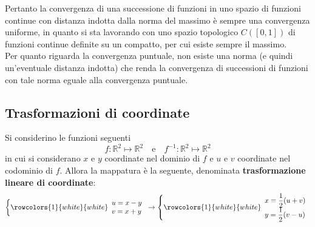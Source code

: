 \documentclass[a4paper]{extarticle}
\begin{document}
Pertanto la convergenza di una successione di funzioni in uno spazio di funzioni continue con distanza indotta dalla norma del massimo è sempre una convergenza uniforme, in quanto si sta lavorando con uno spazio topologico $C([0,1])$ di funzioni continue definite su un compatto, per cui esiste sempre il massimo.\\
Per quanto riguarda la convergenza puntuale, non esiste una norma (e quindi un'eventuale distanza indotta) che renda la convergenza di successioni di funzioni con tale norma eguale alla convergenza puntuale.

\vspace{1em}
\noindent
\subsection{Trasformazioni di coordinate}
Si considerino le funzioni seguenti
\[f : \mathbb{R}^2 \longmapsto \mathbb{R}^2 \hspace{1em} \text{e} \hspace{1em} f^{-1} : \mathbb{R}^2 \longmapsto \mathbb{R}^2\]
in cui si considerano $x$ e $y$ coordinate nel dominio di $f$ e $u$ e $v$ coordinate nel codominio di $f$. Allora la mappatura è la seguente, denominata \textbf{trasformazione lineare di coordinate}:
\[
    \left\{
    \rowcolors{1}{white}{white}
    \begin{array}{l}
        u=x-y\\
        v=x+y
    \end{array}  
    \right.
    \rightarrow
    \left\{
    \rowcolors{1}{white}{white}
    \begin{array}{l}
        x=\dfrac{1}{2} (u+v)\\
        y=\dfrac{1}{2} (v-u)\\
    \end{array}  
    \right.
\]

\vspace{1em}
\noindent
\end{document}
